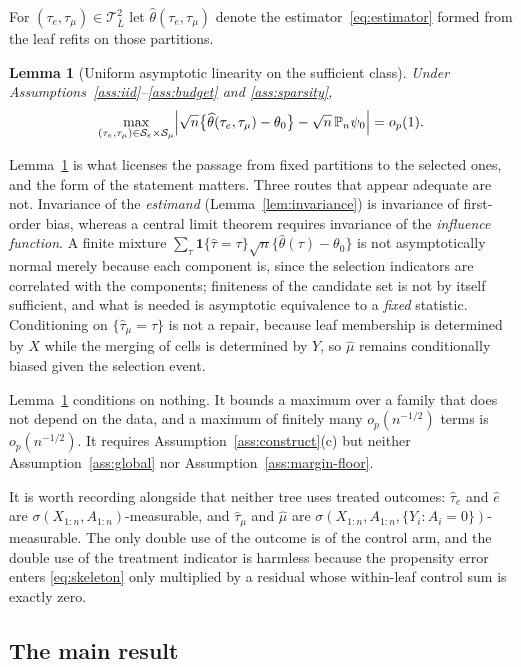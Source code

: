 \documentclass[11pt]{article}
\theoremstyle{plain}
\newtheorem{lemma}[theorem]{Lemma}
\theoremstyle{definition}
\theoremstyle{remark}
\newcommand{\Pn}{\mathbb{P}_n}
\newcommand{\cT}{\mathcal{T}}
\newcommand{\cS}{\mathcal{S}}
\newcommand{\ehat}{\widehat{e}}
\newcommand{\mhat}{\widehat{\mu}}
\newcommand{\that}{\widehat{\tau}}
\newcommand{\thetahat}{\widehat{\theta}}
\begin{document}
For $(\tau_e,\tau_\mu)\in\cT_{\bar L}^2$ let $\thetahat(\tau_e,\tau_\mu)$ denote
the estimator~\eqref{eq:estimator} formed from the leaf refits on those
partitions.

\begin{lemma}[Uniform asymptotic linearity on the sufficient class]
\label{lem:uniform}
Under Assumptions~\ref{ass:iid}--\ref{ass:budget} and \ref{ass:sparsity},
\[
  \max_{(\tau_e,\tau_\mu)\in\cS_e\times\cS_\mu}
  \Bigl\lvert\sqrt n\bigl\{\thetahat(\tau_e,\tau_\mu)-\theta_0\bigr\}
   -\sqrt n\,\Pn\psi_0\Bigr\rvert=o_p(1).
\]
\end{lemma}

Lemma~\ref{lem:uniform} is what licenses the passage from fixed partitions to
the selected ones, and the form of the statement matters. Three routes that
appear adequate are not. Invariance of the \emph{estimand}
(Lemma~\ref{lem:invariance}) is invariance of first-order bias, whereas a
central limit theorem requires invariance of the \emph{influence function}. A
finite mixture $\sum_\tau\mathbf1\{\that=\tau\}\sqrt n\{\thetahat(\tau)-\theta_0\}$
is not asymptotically normal merely because each component is, since the
selection indicators are correlated with the components; finiteness of the
candidate set is not by itself sufficient, and what is needed is asymptotic
equivalence to a \emph{fixed} statistic. Conditioning on $\{\that_\mu=\tau\}$ is
not a repair, because leaf membership is determined by $X$ while the merging of
cells is determined by $Y$, so $\mhat$ remains conditionally biased given the
selection event.

Lemma~\ref{lem:uniform} conditions on nothing. It bounds a maximum over a family
that does not depend on the data, and a maximum of finitely many $o_p(n^{-1/2})$
terms is $o_p(n^{-1/2})$. It requires Assumption~\ref{ass:construct}(c) but
neither Assumption~\ref{ass:global} nor Assumption~\ref{ass:margin-floor}.

It is worth recording alongside that neither tree uses treated outcomes:
$\that_e$ and $\ehat$ are $\sigma(X_{1:n},A_{1:n})$-measurable, and $\that_\mu$
and $\mhat$ are $\sigma(X_{1:n},A_{1:n},\{Y_i:A_i=0\})$-measurable. The only
double use of the outcome is of the control arm, and the double use of the
treatment indicator is harmless because the propensity error enters
\eqref{eq:skeleton} only multiplied by a residual whose within-leaf control sum
is exactly zero.

\subsection{The main result}
\end{document}
